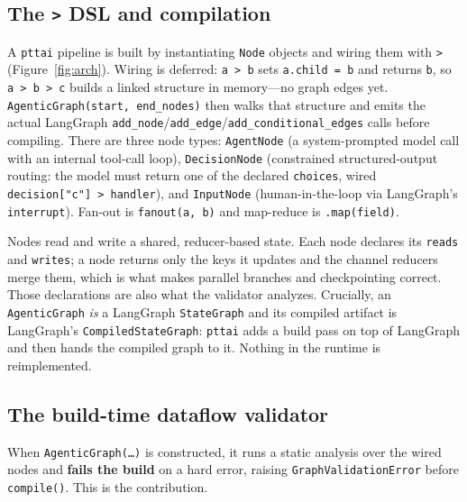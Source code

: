 \documentclass[11pt]{article}
\newcommand{\code}[1]{\texttt{#1}}
\begin{document}
\subsection{The \code{>} DSL and compilation}

A \code{pttai} pipeline is built by instantiating \code{Node} objects and wiring
them with \code{>} (Figure~\ref{fig:arch}). Wiring is deferred: \code{a > b} sets
\code{a.child = b} and returns \code{b}, so \code{a > b > c} builds a linked
structure in memory---no graph edges yet. \code{AgenticGraph(start, end\_nodes)}
then walks that structure and emits the actual LangGraph
\code{add\_node}/\code{add\_edge}/\code{add\_conditional\_edges} calls before
compiling. There are three node types:
\code{AgentNode} (a system-prompted model call with an internal tool-call loop),
\code{DecisionNode} (constrained structured-output routing: the model must
return one of the declared \code{choices}, wired \code{decision["c"] > handler}),
and \code{InputNode} (human-in-the-loop via LangGraph's \code{interrupt}). Fan-out
is \code{fanout(a, b)} and map-reduce is \code{.map(field)}.

Nodes read and write a shared, reducer-based state. Each node declares its
\code{reads} and \code{writes}; a node returns only the keys it updates and the
channel reducers merge them, which is what makes parallel branches and
checkpointing correct. Those declarations are also what the validator analyzes.
Crucially, an \code{AgenticGraph} \emph{is} a LangGraph \code{StateGraph} and its
compiled artifact is LangGraph's \code{CompiledStateGraph}: \code{pttai} adds a
build pass on top of LangGraph and then hands the compiled graph to it. Nothing
in the runtime is reimplemented.

\subsection{The build-time dataflow validator}
\label{sec:validator}

When \code{AgenticGraph(\dots)} is constructed, it runs a static analysis over
the wired nodes and \textbf{fails the build} on a hard error, raising
\code{GraphValidationError} before \code{compile()}. This is the contribution.
\end{document}
